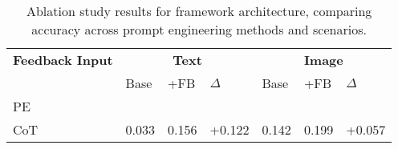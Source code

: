\begin{table}[!h]
\caption{Ablation study results for framework architecture, comparing accuracy across prompt engineering methods and scenarios.}
\label{tab:feedback_input}
\begin{tabular}{p{1.5cm}|p{0.73cm}p{0.73cm}p{0.73cm}|p{0.73cm}p{0.73cm}p{0.73cm}}
\toprule
\textbf{Feedback Input} & \multicolumn{3}{c|}{\textbf{Text}} & \multicolumn{3}{c}{\textbf{Image}} \\
 & Base & +FB & $\Delta{}$ & Base & +FB & $\Delta{}$ \\
PE &  &  &  &  &  &  \\
\midrule
CoT & 0.033 & 0.156 & +0.122 & 0.142 & 0.199 & +0.057 \\
\bottomrule
\end{tabular}
\end{table}
